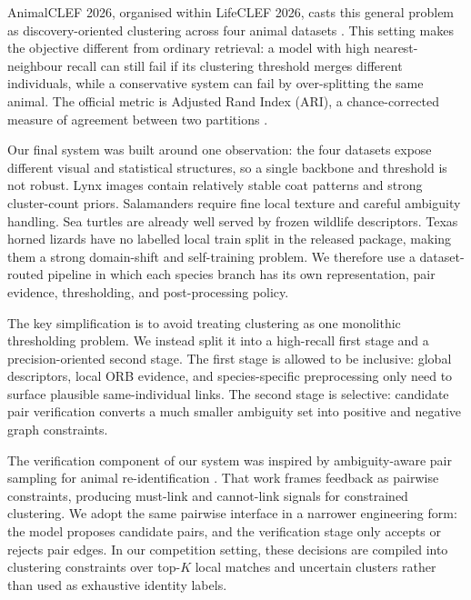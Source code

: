 \documentclass{ceurart}
\begin{document}
AnimalCLEF 2026, organised within LifeCLEF 2026, casts this general problem as discovery-oriented clustering across four animal datasets \cite{lifeclef2026,animalclef2026overview}. This setting makes the objective different from ordinary retrieval: a model with high nearest-neighbour recall can still fail if its clustering threshold merges different individuals, while a conservative system can fail by over-splitting the same animal. The official metric is Adjusted Rand Index (ARI), a chance-corrected measure of agreement between two partitions \cite{hubert1985comparing}.

Our final system was built around one observation: the four datasets expose different visual and statistical structures, so a single backbone and threshold is not robust. Lynx images contain relatively stable coat patterns and strong cluster-count priors. Salamanders require fine local texture and careful ambiguity handling. Sea turtles are already well served by frozen wildlife descriptors. Texas horned lizards have no labelled local train split in the released package, making them a strong domain-shift and self-training problem. We therefore use a dataset-routed pipeline in which each species branch has its own representation, pair evidence, thresholding, and post-processing policy.

The key simplification is to avoid treating clustering as one monolithic thresholding problem. We instead split it into a high-recall first stage and a precision-oriented second stage. The first stage is allowed to be inclusive: global descriptors, local ORB evidence, and species-specific preprocessing only need to surface plausible same-individual links. The second stage is selective: candidate pair verification converts a much smaller ambiguity set into positive and negative graph constraints.

The verification component of our system was inspired by ambiguity-aware pair sampling for animal re-identification \cite{sani2026active}. That work frames feedback as pairwise constraints, producing must-link and cannot-link signals for constrained clustering. We adopt the same pairwise interface in a narrower engineering form: the model proposes candidate pairs, and the verification stage only accepts or rejects pair edges. In our competition setting, these decisions are compiled into clustering constraints over top-$K$ local matches and uncertain clusters rather than used as exhaustive identity labels.
\end{document}

